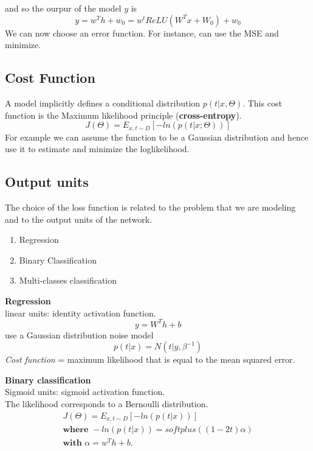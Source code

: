 and so the ourpur of the model $y$ is
\begin{equation}
    y = w^{T} h + w_{0} = w^{t}ReLU\left( W^{T}x + W_{0} \right) + w_{0}
\end{equation}
We can now choose an error function. For instance, can use the MSE and minimize.

\subsection{Cost Function}
A model implicitly defines a conditional distribution $p(t| x, \Theta)$. This cost function is the Maximum likelihood principle (\textbf{cross-entropy}).
\begin{equation}
    J(\Theta) = E_{x, t\sim D} \left[-ln(p(t|x; \Theta))\right]
\end{equation}
For example we can assume the function to be a Gaussian distribution and hence use it to estimate and minimize the loglikelihood.

\subsection{Output units}
The choice of the loss function is related to the problem that we are modeling and to the output units of the network.
\begin{enumerate}
    \item Regression
    \item Binary Classification
    \item Multi-classes classification
\end{enumerate}

\textbf{Regression} \\
linear units: identity activation function.\\
\begin{equation}
    y = W^{T}h + b
\end{equation}
use a Gaussian distribution noise model
\begin{equation}
    p(t|x) = N(t|y, \beta ^{-1})
\end{equation}
\textit{Cost function} = maximum likelihood that is equal to the mean squared error.

\textbf{Binary classification} \\
Sigmoid units: sigmoid activation function.\\
The likelihood corresponds to a Bernoulli distribution.
\begin{equation}
\begin{multlined}
    J(\Theta) = E_{x, t \sim D}\left[-ln(p(t|x))\right] \\
    \textbf{where } -ln (p(t|x)) = softplus ((1 - 2t)\alpha) \\
    \textbf{with } \alpha = w^{T}h + b.
\end{multlined}
\end{equation}

